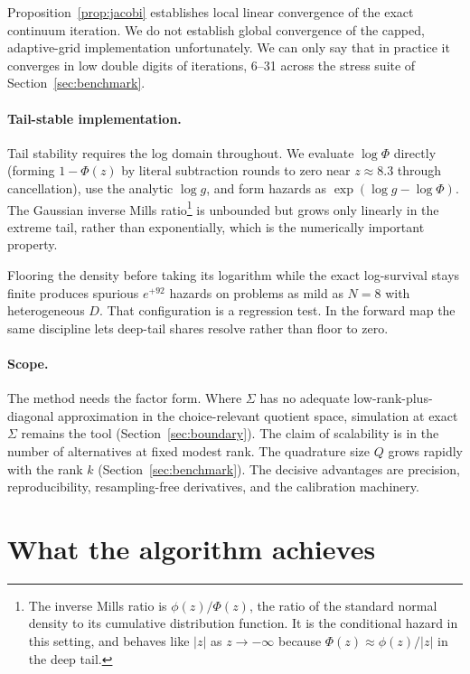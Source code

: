 \documentclass[12pt]{article}
\theoremstyle{remark}
\begin{document}
Proposition~\ref{prop:jacobi} establishes local linear convergence of
the exact continuum iteration. We do not establish global convergence
of the capped, adaptive-grid implementation unfortunately. We can only
say that in practice it converges in low double digits of iterations, 6--31 across the stress suite of
Section~\ref{sec:benchmark}.

\paragraph{Tail-stable implementation.} Tail stability requires the log
domain throughout. We evaluate $\log \Phi$ directly (forming $1 - \Phi(z)$
by literal subtraction rounds to zero near $z \approx 8.3$ through
cancellation), use the analytic $\log g$, and form hazards as
$\exp(\log g - \log \Phi)$. The Gaussian inverse Mills ratio\footnote{The
inverse Mills ratio is $\phi(z)/\Phi(z)$, the ratio of the standard
normal density to its cumulative distribution function. It is the
conditional hazard in this setting, and behaves like $|z|$ as $z \to
-\infty$ because $\Phi(z) \approx \phi(z)/|z|$ in the deep tail.} is
unbounded but grows only linearly in the extreme tail, rather than
exponentially, which is the numerically important property.

Flooring the density before taking its logarithm while the exact
log-survival stays finite produces spurious $e^{+92}$ hazards on problems as
mild as $N = 8$ with heterogeneous $D$.  That configuration is a regression
test. In the forward map the same discipline lets deep-tail shares resolve
rather than floor to zero. 

\paragraph{Scope.} The method needs the factor form. Where $\Sigma$ has no
adequate low-rank-plus-diagonal approximation in the choice-relevant quotient
space, simulation at exact $\Sigma$ remains the tool
(Section~\ref{sec:boundary}). The claim of scalability is in the
number of alternatives at fixed modest rank. The quadrature size $Q$
grows rapidly with the rank $k$ (Section~\ref{sec:benchmark}). The
decisive advantages are precision,
reproducibility, resampling-free derivatives, and the calibration
machinery.

\section{What the algorithm achieves}\label{sec:theory}
\end{document}
